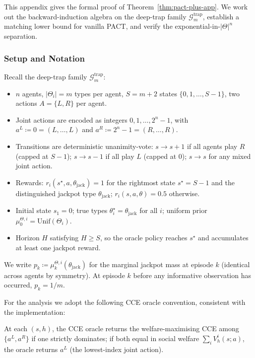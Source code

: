 This appendix gives the formal proof of Theorem~\ref{thm:pact-plus-app}. We work out the backward-induction algebra on the deep-trap family $\mathcal{G}_m^{\mathrm{trap}}$, establish a matching lower bound for vanilla PACT, and verify the exponential-in-$|\Theta|^n$ separation.

\subsubsection{Setup and Notation}
\label{app:pact-plus-setup}

Recall the deep-trap family $\mathcal{G}_m^{\mathrm{trap}}$:
\begin{itemize}
\item $n$ agents, $|\Theta_i| = m$ types per agent, $S = m+2$ states $\{0, 1, \ldots, S-1\}$, two actions $A = \{L, R\}$ per agent.
\item Joint actions are encoded as integers $0, 1, \ldots, 2^n - 1$, with $a^L \coloneqq 0 = (L, \ldots, L)$ and $a^R \coloneqq 2^n - 1 = (R, \ldots, R)$.
\item Transitions are deterministic unanimity-vote: $s \to s+1$ if all agents play $R$ (capped at $S-1$); $s \to s-1$ if all play $L$ (capped at $0$); $s \to s$ for any mixed joint action.
\item Rewards: $r_i(s^\star, a, \theta_{\mathrm{jack}}) = 1$ for the rightmost state $s^\star = S-1$ and the distinguished jackpot type $\theta_{\mathrm{jack}}$; $r_i(s, a, \theta) = 0.5$ otherwise.
\item Initial state $s_1 = 0$; true types $\theta_i^\star = \theta_{\mathrm{jack}}$ for all $i$; uniform prior $\mu_0^{\Theta, i} = \mathrm{Unif}(\Theta_i)$.
\item Horizon $H$ satisfying $H \geq S$, so the oracle policy reaches $s^\star$ and accumulates at least one jackpot reward.
\end{itemize}

We write $p_k \coloneqq \mu_k^{\Theta, i}(\theta_{\mathrm{jack}})$ for the marginal jackpot mass at episode $k$ (identical across agents by symmetry). At episode $k$ before any informative observation has occurred, $p_k = 1/m$.

For the analysis we adopt the following CCE oracle convention, consistent with the implementation:

\begin{assumption}
\label{ass:cce-tiebreak}
At each $(s, h)$, the CCE oracle returns the welfare-maximising CCE among $\{a^L, a^R\}$ if one strictly dominates; if both equal in social welfare $\sum_i V_h^i(s; a)$, the oracle returns $a^L$ (the lowest-index joint action).
\end{assumption}

